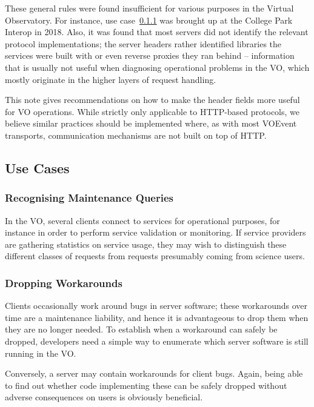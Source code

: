 \documentclass[11pt,a4paper]{ivoa}
\begin{document}
These general rules were found insufficient for various purposes in the
Virtual Observatory.  For instance, use case~\ref{uc:stats} was brought
up at the College Park Interop in 2018.  Also, it was found that most
servers did not identify the relevant protocol implementations; the
server headers rather identified
libraries the services were built with or even reverse proxies they
ran behind -- information that is usually not useful when diagnosing
operational problems in the VO, which mostly originate in the higher
layers of request handling.

This note gives recommendations on how to make the header fields more
useful for VO operations.  While strictly only applicable to HTTP-based
protocols, we believe similar practices should be implemented where, as
with most VOEvent transports, communication mechanisms are not built on
top of HTTP.


\subsection{Use Cases}

\subsubsection{Recognising Maintenance Queries}
\label{uc:stats}

In the VO, several clients connect to services for operational purposes,
for instance in order to perform service validation or monitoring. If
service providers are gathering statistics on service usage, they may
wish to distinguish these different classes of requests from requests
presumably coming from science users.

\subsubsection{Dropping Workarounds}
\label{uc:global}

Clients occasionally work around bugs in server software; these
workarounds over time are a maintenance liability, and hence it is
advantageous to drop them when they are no longer needed.  To establish
when a workaround can safely be dropped, developers need a simple way to
enumerate which server software is still running in the VO.

Conversely, a server may contain workarounds for client bugs.  Again,
being able to find out whether code implementing these can be safely
dropped without adverse consequences on users is obviously beneficial.
\end{document}
